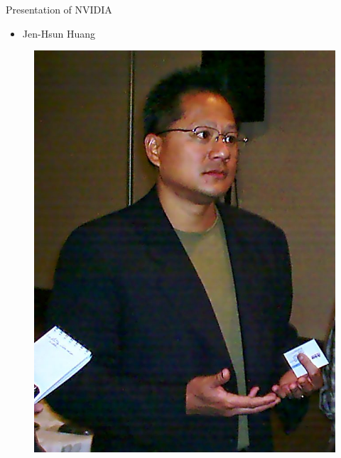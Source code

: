 \documentclass{beamer}
\begin{document}
\begin{frame}{Presentation of NVIDIA}
	\transdissolve[duration=0.08]
	\begin{block}{}
		\begin{itemize}
			\item<+->{Jen-Hsun Huang}
		\end{itemize}
	\end{block}
	\begin{figure}[h]
		\includegraphics[width=0.50\textheight]{JensenHuang.jpg}
	\end{figure}
\end{frame}
\end{document}
